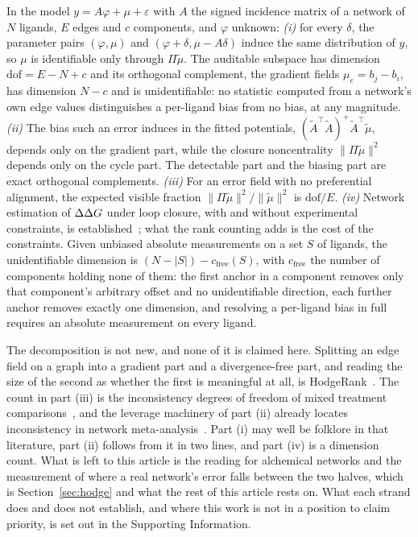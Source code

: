 \begin{theorem}\label{thm:hodge}
In the model $y=A\varphi+\mu+\varepsilon$ with $A$ the signed incidence matrix of a network of $N$
ligands, $E$ edges and $c$ components, and $\varphi$ unknown:
\emph{(i)} for every $\delta$, the parameter pairs $(\varphi,\mu)$ and $(\varphi+\delta,\mu-A\delta)$
induce the same distribution of $y$, so $\mu$ is identifiable only through $\Pi\tilde\mu$. The
auditable subspace has dimension $\mathrm{dof}=E-N+c$ and its orthogonal complement, the gradient
fields $\mu_e=b_j-b_i$, has dimension $N-c$ and is unidentifiable: no statistic computed from a
network's own edge values distinguishes a per-ligand bias from no bias, at any magnitude.
\emph{(ii)} The bias such an error induces in the fitted potentials, $(\tilde A^\top\tilde
A)^{+}\tilde A^\top\tilde\mu$, depends only on the gradient part, while the closure noncentrality
$\|\Pi\tilde\mu\|^2$ depends only on the cycle part. The detectable part and the biasing part are
exact orthogonal complements.
\emph{(iii)} For an error field with no preferential alignment, the expected visible fraction
$\|\Pi\tilde\mu\|^2/\|\tilde\mu\|^2$ is $\mathrm{dof}/E$.
\emph{(iv)} Network estimation of $\Delta\Delta G$ under loop closure, with and without experimental
constraints, is established~\citep{xu2019diffnet,giese2021variational}; what the rank counting adds
is the cost of the constraints. Given unbiased absolute measurements on a set $S$ of ligands, the
unidentifiable dimension is
$(N-|S|)-c_{\mathrm{free}}(S)$, with $c_{\mathrm{free}}$ the number of components holding none of
them: the first anchor in a component removes only that component's arbitrary offset and no
unidentifiable direction, each further anchor removes exactly one dimension, and resolving a
per-ligand bias in full requires an absolute measurement on every ligand.
\end{theorem}
The decomposition is not new, and none of it is claimed here. Splitting an edge field on a graph
into a gradient part and a divergence-free part, and reading the size of the second as whether the
first is meaningful at all, is HodgeRank~\citep{jiang2011hodgerank}. The count in part (iii) is
the inconsistency degrees of freedom of mixed treatment
comparisons~\citep{lu2006inconsistency,higgins2012inconsistency}, and the leverage machinery of
part (ii) already locates inconsistency in network meta-analysis~\citep{krahn2013graphical}. Part
(i) may well be folklore in that literature, part (ii) follows from it in two lines, and part (iv)
is a dimension count. What is left to this article is the reading for alchemical networks and the
measurement of where a real network's error falls between the two halves, which is
Section~\ref{sec:hodge} and what the rest of this article rests on. What each strand does and does
not establish, and where this work is not in a position to claim priority, is set out in the
Supporting Information.

